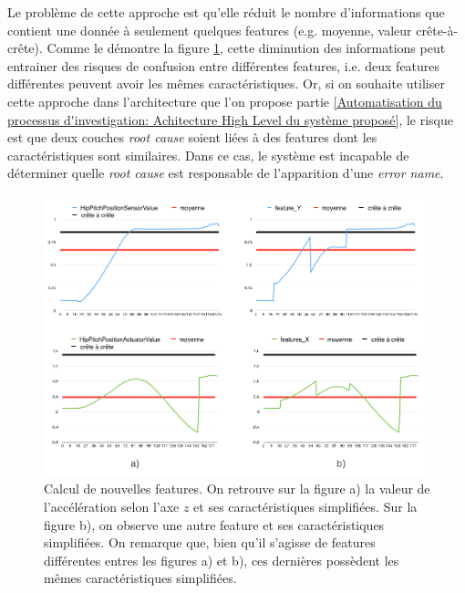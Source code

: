 Le problème de cette approche est qu'elle réduit le nombre d'informations que contient une donnée à seulement quelques features (e.g. moyenne, valeur crête-à-crête). Comme le démontre la figure \ref{fig:Comparaison de deux caractéristiques}, cette diminution des informations peut entrainer des risques de confusion entre différentes features, i.e. deux features différentes peuvent avoir les mêmes caractéristiques. Or, si on souhaite utiliser cette approche dans l'architecture que l'on propose partie \ref{Automatisation du processus d'investigation: Achitecture High Level du système proposé}, le risque est que deux couches \emph{root cause} soient liées à des features dont les caractéristiques sont similaires. Dans ce cas, le système est incapable de déterminer quelle \emph{root cause} est responsable de l'apparition d'une \emph{error name}.

\begin{figure}[h]
	\centering\includegraphics[width=15cm]{images/caracteristiques_simples_2.png}
	\caption[Comparaison de deux caractéristiques]{Calcul de nouvelles features. On retrouve sur la figure a) la valeur de l'accélération selon l'axe $z$ et ses caractéristiques simplifiées. Sur la figure b), on observe une autre feature et ses caractéristiques simplifiées. On remarque que, bien qu'il s'agisse de features différentes entres les figures a) et b), ces dernières possèdent les mêmes caractéristiques simplifiées.}
	\label{fig:Comparaison de deux caractéristiques}
\end{figure}

